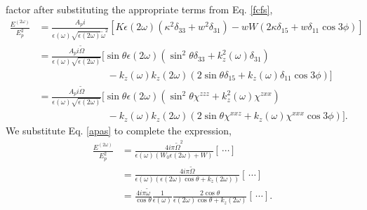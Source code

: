 factor after substituting the appropriate terms from Eq. \eqref{fcfs},
\begin{equation*}
\begin{split}
\frac{E^{(2\omega)}}{E^{2}_{p}}
&= \frac{A_{p}i}{\epsilon(\omega)\sqrt{\epsilon(2\omega)}\tilde{\omega}^2}
   \left[
   K\epsilon(2\omega)(\kappa^{2}\delta_{33} + w^{2}\delta_{31})
   - wW(2\kappa\delta_{15} + w\delta_{11}\cos3\phi)
   \right]\\
&= \frac{A_{p}i\tilde{\Omega}}{\epsilon(\omega)\sqrt{\epsilon(2\omega)}}
   \big[
   \sin\theta\epsilon(2\omega)(
   \sin^{2}\theta\delta_{33} + k^{2}_{z}(\omega)\delta_{31})\\
   &\qquad\qquad\qquad\quad- k_{z}(\omega)k_{z}(2\omega)(2\sin\theta\delta_{15}
   + k_{z}(\omega)\delta_{11}\cos3\phi)
   \big]\\
&= \frac{A_{p}i\tilde{\Omega}}{\epsilon(\omega)\sqrt{\epsilon(2\omega)}}
   \big[
   \sin\theta\epsilon(2\omega)(
   \sin^{2}\theta\chi^{zzz} + k^{2}_{z}(\omega)\chi^{zxx})\\
   &\qquad\qquad\qquad\quad- k_{z}(\omega)k_{z}(2\omega)(2\sin\theta\chi^{xxz}
   + k_{z}(\omega)\chi^{xxx}\cos3\phi)
   \big].
\end{split}
\end{equation*}
We substitute Eq. \eqref{apas} to complete the expression,
\begin{equation*}
\begin{split}
\frac{E^{(2\omega)}}{E^{2}_{p}}
&= \frac{4i\pi\tilde{\Omega}^{2}}{\epsilon(\omega)(W_{0}\epsilon(2\omega) + W)}
   [\,\cdots]\\
&= \frac{4i\pi\tilde{\Omega}}
   {\epsilon(\omega)(\epsilon(2\omega)\cos\theta + k_{z}(2\omega))}
   [\,\cdots]\\
&= \frac{4i\pi\tilde{\omega}}{\cos\theta}
   \frac{1}{\epsilon(\omega)}
   \frac{2\cos\theta}{\epsilon(2\omega)\cos\theta + k_{z}(2\omega)}[\,\cdots].
\end{split}
\end{equation*}

